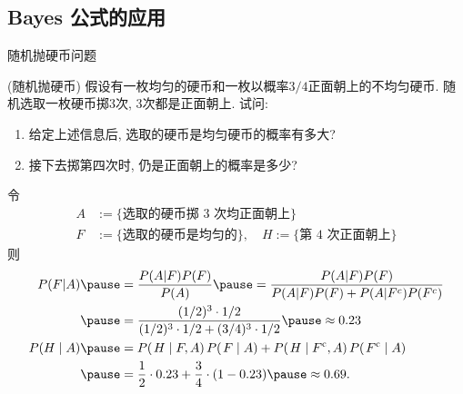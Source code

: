 \documentclass[Prob-All.tex]{subfiles}
\begin{document}
\subsection{Bayes 公式的应用}
\begin{frame}{随机抛硬币问题}
	\begin{exam}({\tc 随机抛硬币}) 假设有一枚均匀的硬币和一枚以概率$3/4$正面朝上的不均匀硬币. 随机选取一枚硬币掷$3$次, $3$次都是正面朝上. 试问: %
		\vspace{-0.4cm}
	\begin{enumerate}[<+-|alert@+>]
		\item 给定上述信息后, 选取的硬币是均匀硬币的概率有多大?
		\item 接下去掷第四次时, 仍是正面朝上的概率是多少?
		\end{enumerate}
	\end{exam}
	\pause
\begin{jieda}
  令 \begin{align*}
	A &:=\{\mbox{选取的硬币掷 3 次均正面朝上}\}\\
	F & :=\{\mbox{选取的硬币是均匀的}\},\quad
	H :=\{\mbox{第 4 次正面朝上} \}
  \end{align*}
  则\pause
  {\small \begin{align*}
	P(F|A) \pause &=\frac{P(A|F)P(F)}{P(A)}\pause =\frac{P(A|F)P(F)}{P(A|F)P(F)+P(A|F^c)P(F^c)} \\
	\pause &=\frac{(1/2)^3 \cdot 1/2}{(1/2)^3 \cdot 1/2 +(3/4)^3 \cdot  1/2}\pause \approx 0.23\\
    P(H\mid A)\pause & =P(\left.H\mid F,A\right)P(\left.F\mid A\right)+P(\left.H\mid F^{\mathrm{c}},A\right)P(\left.F^{\mathrm{c}}\mid A\right)  \\
	\pause &=\frac{1}{2}\cdot0.23+\frac{3}{4}\cdot(1-0.23) \pause \approx 0.69.
  \end{align*}}
\end{jieda}



\end{frame}
\end{document}
